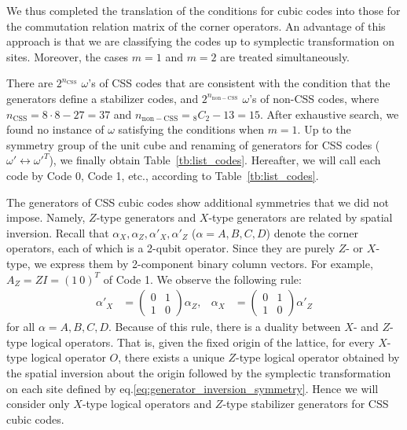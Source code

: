 \documentclass[letterpaper,10pt,pra,aps,showpacs,twocolumn]{revtex4-1}
\theoremstyle{definition} \newtheorem{defn}{Definition}
\theoremstyle{definition} \newtheorem{remark}{Remark}
\begin{document}
We thus completed the translation of the conditions for cubic codes into those for the commutation relation matrix of the corner operators. An advantage of this approach is that we are classifying the codes up to symplectic transformation on sites. Moreover, the cases $m=1$ and $m=2$ are treated simultaneously.

There are $2^{n_\mathrm{CSS}}$ $\omega$'s of CSS codes that are consistent with the condition that the generators define a stabilizer codes, and $2^{n_\mathrm{non-CSS}}$ $\omega$'s of non-CSS codes, where $ n_\mathrm{CSS} = 8\cdot8 - 27 = 37 $ and $ n_\mathrm{non-CSS} = {_8 C _2} - 13 = 15 $. After exhaustive search, we found no instance of $\omega$ satisfying the conditions when $m=1$. Up to the symmetry group of the unit cube and renaming of generators for CSS codes ($\omega' \leftrightarrow \omega'^T$), we finally obtain Table~\ref{tb:list_codes}. Hereafter, we will call each code by Code 0, Code 1, etc., according to Table~\ref{tb:list_codes}.

The generators of CSS cubic codes show additional symmetries that we did not impose. Namely, $Z$-type generators and $X$-type generators are related by spatial inversion. Recall that $\alpha_X, \alpha_Z, \alpha'_X, \alpha'_Z$ ($\alpha = A,B,C,D$) denote the corner operators, each of which is a 2-qubit operator. Since they are purely $Z$- or $X$-type, we express them by 2-component binary column vectors. For example, $A_Z = ZI = (1 \ 0 )^T$ of Code 1. We observe the following rule:
\begin{align}
 \alpha'_X &= \begin{pmatrix} 0 & 1 \\ 1 & 0 \end{pmatrix} \alpha_Z , &
 \alpha_X  &= \begin{pmatrix} 0 & 1 \\ 1 & 0 \end{pmatrix} \alpha'_Z
\label{eq:generator_inversion_symmetry}
\end{align}
for all $\alpha = A,B,C,D$. Because of this rule, there is a duality between $X$- and $Z$-type logical operators. That is, given the fixed origin of the lattice, for every $X$-type logical operator $O$, there exists a unique $Z$-type logical operator obtained by the spatial inversion about the origin followed by the symplectic transformation on each site defined by eq.\eqref{eq:generator_inversion_symmetry}. Hence we will consider only $X$-type logical operators and $Z$-type stabilizer generators for CSS cubic codes.
\end{document}
